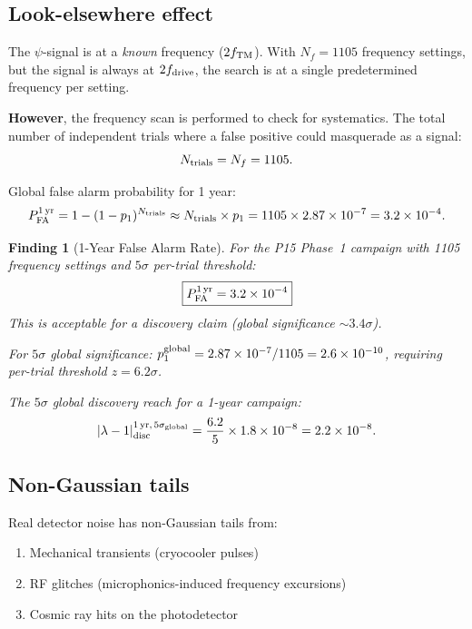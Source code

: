 \documentclass[11pt]{article}
\newtheorem{finding}{Finding}
\newcommand{\ee}[1]{\times 10^{#1}}
\newcommand{\lam}{\lambda}
\begin{document}
\subsection{Look-elsewhere effect}

The $\psi$-signal is at a \textit{known} frequency ($2f_{\rm TM}$).
With $N_f = 1105$ frequency settings, but the signal is always at
$2f_{\rm drive}$, the search is at a single predetermined frequency
per setting.

\textbf{However}, the frequency scan is performed to check for
systematics. The total number of independent trials where a false
positive could masquerade as a signal:
\begin{equation}
N_{\rm trials} = N_f = 1105.
\end{equation}

Global false alarm probability for 1 year:
\begin{equation}
P_{\rm FA}^{\rm 1\,yr} = 1 - (1 - p_1)^{N_{\rm trials}}
\approx N_{\rm trials} \times p_1 = 1105 \times 2.87\ee{-7}
= 3.2\ee{-4}.
\end{equation}

\begin{finding}[1-Year False Alarm Rate]
\label{find:FAR}
For the P15 Phase~1 campaign with 1105 frequency settings and
$5\sigma$ per-trial threshold:
\begin{equation}
\boxed{P_{\rm FA}^{\rm 1\,yr} = 3.2\ee{-4}}
\end{equation}
This is acceptable for a discovery claim (global significance
$\sim 3.4\sigma$).

For $5\sigma$ \textit{global} significance:
$p_1^{\rm global} = 2.87\ee{-7}/1105 = 2.6\ee{-10}$,
requiring per-trial threshold $z = 6.2\sigma$.

The $5\sigma$ global discovery reach for a 1-year campaign:
\begin{equation}
|\lam-1|_{\rm disc}^{\rm 1\,yr,\,5\sigma_{\rm global}}
= \frac{6.2}{5} \times 1.8\ee{-8} = 2.2\ee{-8}.
\end{equation}
\end{finding}

\subsection{Non-Gaussian tails}

Real detector noise has non-Gaussian tails from:
\begin{enumerate}
\item Mechanical transients (cryocooler pulses)
\item RF glitches (microphonics-induced frequency excursions)
\item Cosmic ray hits on the photodetector
\end{enumerate}
\end{document}

